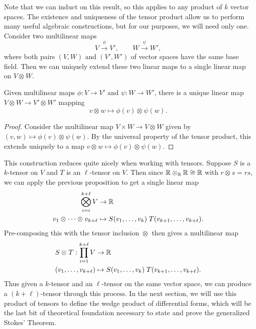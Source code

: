 \documentclass[twoside,10pt]{article}
\begin{document}
Note that we can induct on this result, so this applies to any product of $k$ vector spaces. The existence and uniqueness of the tensor product allow us to perform many useful algebraic constructions, but for our purposes, we will need only one. Consider two multilinear maps
\[
V \stackrel{\phi}{\to } V', \qquad W \stackrel{\psi}{\to } W',
\] where both pairs $(V,W)$ and $(V',W')$ of vector spaces have the same base field. Then we can uniquely extend these two linear maps to a single linear map on $V \otimes_{}W$.

\begin{prop}
	Given multilinear maps $\phi:V\to V'$ and $\psi:W\to W'$, there is a unique linear map $V \otimes_{}W \to V' \otimes_{}W'$ mapping
	\[
		v \otimes_{}w \mapsto \phi(v) \otimes_{} \psi(w).
	\] 
\end{prop}
\begin{proof}
	Consider the multilinear map $V \times W \to V \otimes_{}W$ given by $(v,w) \mapsto \phi(v) \otimes_{}\psi(w)$. By the universal property of the tensor product, this extends uniquely to a map $v \otimes_{}w \mapsto \phi(v) \otimes_{}\psi(w)$.
\end{proof}

This construction reduces quite nicely when working with tensors. Suppose $S$ is a $k$-tensor on $V$ and $T$ is an $\ell$-tensor on $V$. Then since $\mathbb{R} \otimes_{\mathbb{R}}\mathbb{R} \cong \mathbb{R}$ with $r \otimes_{}s = rs$, we can apply the previous proposition to get a single linear map
\begin{align*}
	\bigotimes_{i=i}^{k+\ell} V &\to \mathbb{R} \\
	v_1 \otimes_{} \dots \otimes_{} v_{k+\ell} &\mapsto S(v_1,\dots,v_{k}) \; T(v_{k+1},\dots,v_{k+\ell}).
\end{align*}
Pre-composing this with the tensor inclusion $\otimes_{}$ then gives a multilinear map
\begin{align*}
	S \otimes_{}T: \prod_{i=1}^{k+\ell} V &\to \mathbb{R} \\
	(v_1,\dots,v_{k+\ell}) &\mapsto S(v_1,\dots,v_{k}) \; T(v_{k+1},\dots,v_{k+\ell}).
\end{align*}
Thus given a $k$-tensor and an $\ell$-tensor on the same vector space, we can produce a $(k+\ell)$-tensor through this process. In the next section, we will use this product of tensors to define the wedge product of differential forms, which will be the last bit of theoretical foundation necessary to state and prove the generalized Stokes' Theorem.

\end{document}

